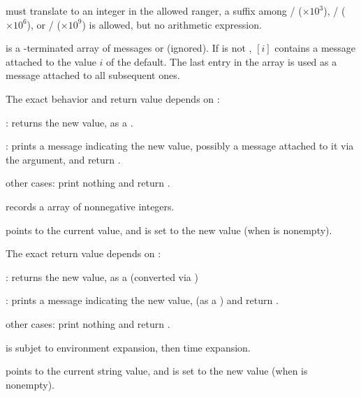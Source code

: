 \item {} must translate to an integer in the allowed ranger, a suffix
among
/ ($\times 10^3$),
/ ($\times 10^6$),
or
/ ($\times 10^9$) is allowed, but no arithmetic expression.

\item {} is a \kbd[NULL]-terminated array of messages or 
(ignored). If  is not , $[i]$ contains
a message attached to the value $i$ of the default. The last entry in the
 array is used as a message attached to all subsequent ones.

The exact behavior and return value depends on :

\item {}: returns the new value, as a .

\item {}: prints a message indicating the new value,
possibly a message attached to it via the  argument, and return
.

\item other cases: print nothing and return .


\item records a  array of nonnegative integers.

\item {} points to the current  value, and is set to the
new value (when  is nonempty).

The exact return value depends on :

\item {}: returns the new value, as a  (converted via
)

\item {}: prints a message indicating the new value,
(as a ) and return .

\item other cases: print nothing and return .

\item {} is subjet to environment expansion, then time expansion.

\item {} points to the current string value, and is set to the new
value (when  is nonempty).

